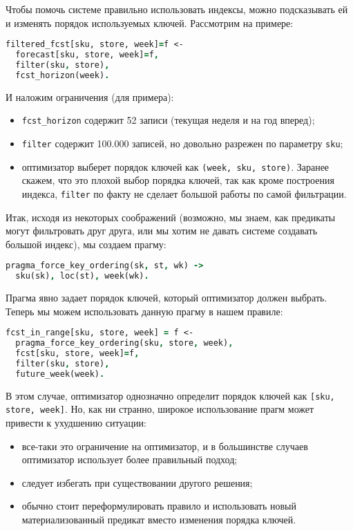 Чтобы помочь системе правильно использовать индексы, можно подсказывать ей и изменять порядок используемых ключей. Рассмотрим на примере:

\begin{lstlisting}[language=Prolog]
filtered_fcst[sku, store, week]=f <-
  forecast[sku, store, week]=f,
  filter(sku, store),
  fcst_horizon(week).
\end{lstlisting}

И наложим ограничения (для примера):

\begin{itemize}
  \item \lstinline{fcst_horizon} содержит 52 записи (текущая неделя и на год вперед);
  \item \lstinline{filter} содержит 100.000 записей, но довольно разрежен по параметру \lstinline{sku};
  \item оптимизатор выберет порядок ключей как \lstinline{(week, sku, store)}. Заранее скажем, что это плохой выбор порядка ключей, так как кроме построения индекса, \lstinline{filter} по факту не сделает большой работы по самой фильтрации.
\end{itemize}

Итак, исходя из некоторых соображений (возможно, мы знаем, как предикаты могут фильтровать друг друга, или мы хотим не давать системе создавать большой индекс), мы создаем прагму:

\begin{lstlisting}[language=Prolog]
pragma_force_key_ordering(sk, st, wk) ->
  sku(sk), loc(st), week(wk).
\end{lstlisting}

Прагма явно задает порядок ключей, который оптимизатор должен выбрать. Теперь мы можем использовать данную прагму в нашем правиле:

\begin{lstlisting}[language=Prolog]
fcst_in_range[sku, store, week] = f <-
  pragma_force_key_ordering(sku, store, week),
  fcst[sku, store, week]=f,
  filter(sku, store),
  future_week(week).
\end{lstlisting}

В этом случае, оптимизатор однозначно определит порядок ключей как \lstinline{[sku, store, week]}. Но, как ни странно, широкое использование прагм может привести к ухудшению ситуации:

\begin{itemize}
  \item все-таки это ограничение на оптимизатор, и в большинстве случаев оптимизатор использует более правильный подход;
  \item следует избегать при существовании другого решения;
  \item обычно стоит переформулировать правило и использовать новый материализованный предикат вместо изменения порядка ключей.
\end{itemize}

